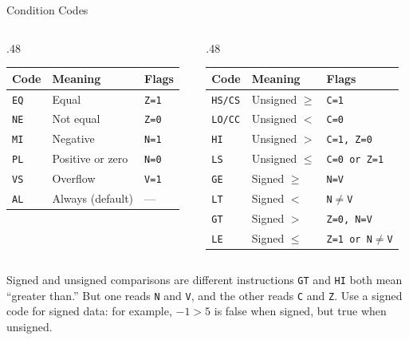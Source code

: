 \documentclass[9pt,aspectratio=169,xcolor=table]{beamer}
\begin{document}
\begin{frame}{Condition Codes}
    \begin{columns}[T]
    \begin{column}{.48\textwidth}
    	\centering
        {\normalsize
        \striped
        \begin{tabular}{@{}l l l@{}}
            \toprule
            \textbf{Code} & \textbf{Meaning} & \textbf{Flags} \\
            \midrule
            \texttt{EQ} & Equal            & \texttt{Z=1} \\
            \texttt{NE} & Not equal        & \texttt{Z=0} \\
            \texttt{MI} & Negative         & \texttt{N=1} \\
            \texttt{PL} & Positive or zero & \texttt{N=0} \\
            \texttt{VS} & Overflow         & \texttt{V=1} \\
            \texttt{AL} & Always (default) & --- \\
            \bottomrule
        \end{tabular}}
    \end{column}
    \begin{column}{.48\textwidth}
    	\centering
        {\normalsize
        \striped
        \begin{tabular}{@{}l l l@{}}
            \toprule
            \textbf{Code} & \textbf{Meaning} & \textbf{Flags} \\
            \midrule
            \texttt{HS/CS} & Unsigned $\geq$ & \texttt{C=1} \\
            \texttt{LO/CC} & Unsigned $<$    & \texttt{C=0} \\
            \texttt{HI}    & Unsigned $>$    & \texttt{C=1, Z=0} \\
            \texttt{LS}    & Unsigned $\leq$ & \texttt{C=0 or Z=1} \\
            \midrule
            \texttt{GE}    & Signed $\geq$   & \texttt{N=V} \\
            \texttt{LT}    & Signed $<$      & \texttt{N$\neq$V} \\
            \texttt{GT}    & Signed $>$      & \texttt{Z=0, N=V} \\
            \texttt{LE}    & Signed $\leq$   & \texttt{Z=1 or N$\neq$V} \\
            \bottomrule
        \end{tabular}}
    \end{column}
    \end{columns}

    \vspace{2mm}
    \begin{block}{Signed and unsigned comparisons are different instructions}
        \texttt{GT} and \texttt{HI} both mean ``greater than.'' But one
        reads \texttt{N} and \texttt{V}, and the other reads \texttt{C}
        and \texttt{Z}. \alert{Use a signed code for signed data}: for
        example, $-1 > 5$ is false when signed, but true when unsigned.
    \end{block}
\end{frame}
\end{document}
